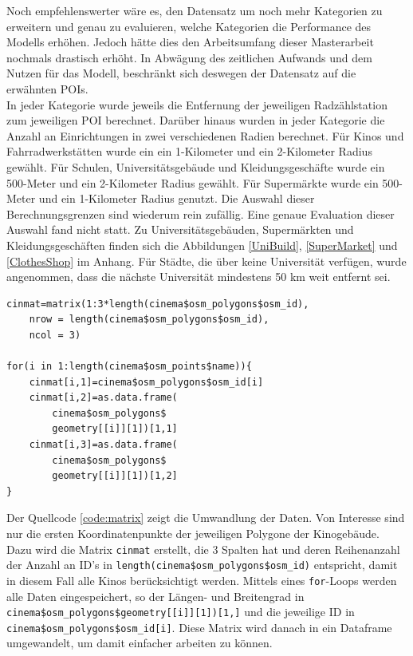 \documentclass[a4paper,12pt]{thesis}
\begin{document}
Noch empfehlenswerter wäre es, den Datensatz um noch mehr Kategorien zu erweitern und genau zu evaluieren, welche Kategorien die Performance des Modells erhöhen. Jedoch hätte dies den Arbeitsumfang dieser Masterarbeit nochmals drastisch erhöht. In Abwägung des zeitlichen Aufwands und dem Nutzen für das Modell, beschränkt sich deswegen der Datensatz auf die erwähnten POIs.\\
In jeder Kategorie wurde jeweils die Entfernung der jeweiligen Radzählstation zum jeweiligen POI berechnet. Darüber hinaus wurden in jeder Kategorie die Anzahl an Einrichtungen in zwei verschiedenen Radien berechnet. Für Kinos und Fahrradwerkstätten wurde ein ein 1-Kilometer und ein 2-Kilometer Radius gewählt. Für Schulen, Universitätsgebäude und Kleidungsgeschäfte wurde ein 500-Meter und ein 2-Kilometer Radius gewählt. Für Supermärkte wurde ein 500-Meter und ein 1-Kilometer Radius genutzt. Die Auswahl dieser Berechnungsgrenzen sind wiederum rein zufällig. Eine genaue Evaluation dieser Auswahl fand nicht statt. Zu Universitätsgebäuden, Supermärkten und Kleidungsgeschäften finden sich die Abbildungen \ref{UniBuild}, \ref{SuperMarket} und \ref{ClothesShop} im Anhang. Für Städte, die über keine Universität verfügen, wurde angenommen, dass die nächste Universität mindestens 50 km weit entfernt sei.


\begin{minipage}{\linewidth}
\begin{lstlisting}[caption={Speichere die OSM Koordinaten},label=code:matrix]
cinmat=matrix(1:3*length(cinema$osm_polygons$osm_id), 
	nrow = length(cinema$osm_polygons$osm_id), 
	ncol = 3)
	
for(i in 1:length(cinema$osm_points$name)){
   	cinmat[i,1]=cinema$osm_polygons$osm_id[i]
	cinmat[i,2]=as.data.frame(
		cinema$osm_polygons$
		geometry[[i]][1])[1,1]
	cinmat[i,3]=as.data.frame(
		cinema$osm_polygons$
		geometry[[i]][1])[1,2]
}
\end{lstlisting}
\end{minipage}

Der Quellcode \ref{code:matrix} zeigt die Umwandlung der Daten. Von Interesse sind nur die ersten Koordinatenpunkte der jeweiligen Polygone der Kinogebäude. Dazu wird die Matrix \glqq{}\lstinline|cinmat|\grqq{} erstellt, die 3 Spalten hat und deren Reihenanzahl der Anzahl an ID's in \lstinline|length(cinema$osm_polygons$osm_id)| entspricht, damit in diesem Fall alle Kinos berücksichtigt werden. Mittels eines \lstinline|for|-Loops werden alle Daten eingespeichert, so der Längen- und Breitengrad in \lstinline|cinema$osm_polygons$geometry[[i]][1])[1,]| und die jeweilige ID in \lstinline|cinema$osm_polygons$osm_id[i]|. Diese Matrix wird danach in ein Dataframe umgewandelt, um damit einfacher arbeiten zu können.\\
\end{document}
